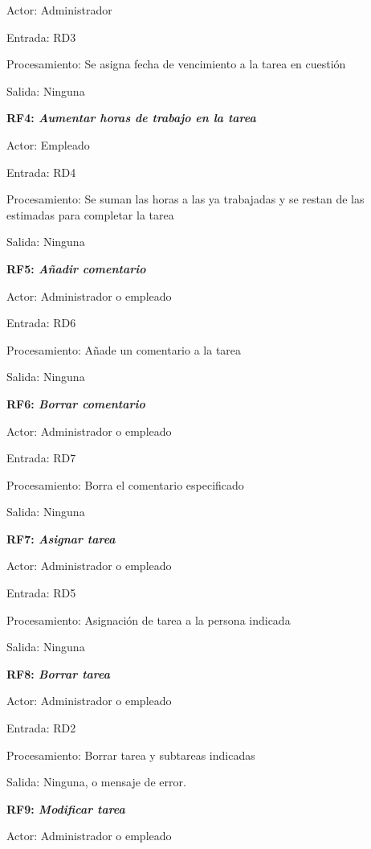 \documentclass[paper=a4, fontsize=11pt, spanish]{scrartcl}
\begin{document}
Actor: Administrador

Entrada: RD3

Procesamiento: Se asigna fecha de vencimiento a la tarea en cuestión

Salida: Ninguna

\setlength{\parindent}{0em}
\textbf{RF4: \textit{Aumentar horas de trabajo en la tarea}}
\setlength{\parindent}{2em}

Actor: Empleado

Entrada: RD4

Procesamiento: Se suman las horas a las ya trabajadas y se restan de las estimadas para completar la tarea

Salida: Ninguna

\setlength{\parindent}{0em}
\textbf{RF5: \textit{Añadir comentario}}
\setlength{\parindent}{2em}

Actor: Administrador o empleado

Entrada: RD6

Procesamiento: Añade un comentario a la tarea

Salida: Ninguna

\setlength{\parindent}{0em}
\textbf{RF6: \textit{Borrar comentario}}
\setlength{\parindent}{2em}

Actor: Administrador o empleado

Entrada: RD7

Procesamiento: Borra el comentario especificado

Salida: Ninguna

\setlength{\parindent}{0em}
\textbf{RF7: \textit{Asignar tarea}}
\setlength{\parindent}{2em}

Actor: Administrador o empleado

Entrada: RD5

Procesamiento: Asignación de tarea a la persona indicada

Salida: Ninguna

\setlength{\parindent}{0em}
\textbf{RF8: \textit{Borrar tarea}}
\setlength{\parindent}{2em}

Actor: Administrador o empleado

Entrada: RD2

Procesamiento: Borrar tarea y subtareas indicadas

Salida: Ninguna, o mensaje de error.

\setlength{\parindent}{0em}
\textbf{RF9: \textit{Modificar tarea}}
\setlength{\parindent}{2em}

Actor: Administrador o empleado
\end{document}

